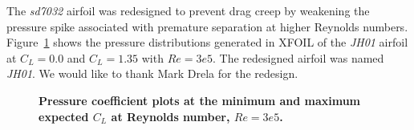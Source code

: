 \documentclass[]{aiaa-tc}%
\begin{document}
The \emph{sd7032} airfoil was redesigned to prevent drag creep by weakening the pressure spike associated with premature separation at higher Reynolds numbers.  
Figure~\ref{f:jhcps} shows the pressure distributions generated in XFOIL of the \emph{JH01} airfoil at $C_L=0.0$ and $C_L=1.35$ with $Re=3e5$.
The redesigned airfoil was named \emph{JH01}. We would like to thank Mark Drela for the redesign.

\begin{figure}[H]
 \begin{subfigmatrix}{2}%
 \end{subfigmatrix}
 \caption{\textbf{Pressure coefficient plots at the minimum and maximum expected $C_L$ at Reynolds number, $Re=3e5$.}}
 \label{f:jhcps}
\end{figure}
\end{document}

